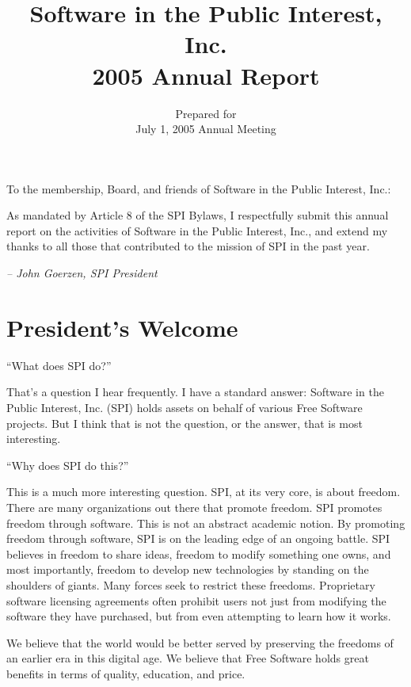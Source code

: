 \documentclass[letterpaper]{report}
\begin{document}
\title{Software in the Public Interest, Inc.\\
2005 Annual Report}
\date{Prepared for\\
July 1, 2005 Annual Meeting}

\maketitle

To the membership, Board, and friends of Software in the Public Interest,
Inc.:

As mandated by Article 8 of the SPI Bylaws, I respectfully submit this
annual report on the activities of Software in the Public Interest, Inc.,
and extend my thanks to all those that contributed to the mission of SPI in
the past year.

\emph{-- John Goerzen, SPI President}

\newpage

\tableofcontents

\newpage

\chapter{President's Welcome}
\label{sec:president}

``What does SPI do?''

That's a question I hear frequently. I have a standard answer: Software in
the Public Interest, Inc. (SPI) holds assets on behalf of various Free
Software projects. But I think that is not the question, or the answer,
that is most interesting.

``Why does SPI do this?''

This is a much more interesting question. SPI, at its very core, is about
freedom. There are many organizations out there that promote freedom. SPI
promotes freedom through software. This is not an abstract academic notion.
By promoting freedom through software, SPI is on the leading edge of an
ongoing battle. SPI believes in freedom to share ideas, freedom to modify
something one owns, and most importantly, freedom to develop new
technologies by standing on the shoulders of giants. Many forces seek to
restrict these freedoms.  Proprietary software licensing agreements often
prohibit users not just from modifying the software they have purchased,
but from even attempting to learn how it works.

We believe that the world would be better served by preserving the freedoms
of an earlier era in this digital age. We believe that Free Software holds
great benefits in terms of quality, education, and price.
\end{document}
